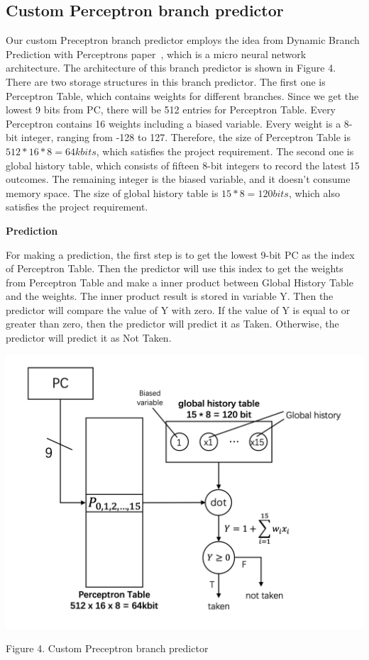 \documentclass[conference]{IEEEtran}
\begin{document}
\subsection{Custom Perceptron branch predictor}
Our custom Preceptron branch predictor employs the idea from Dynamic Branch Prediction with Perceptrons paper~\cite{nicepaper4}, which is a micro neural network architecture. The architecture of this branch predictor is shown in Figure 4.
There are two storage structures in this branch predictor. The first one is Perceptron Table, which contains weights for different branches. Since we get the lowest 9 bits from PC, there will be 512 entries for Perceptron Table. 
Every Perceptron contains 16 weights including a biased variable. Every weight is a 8-bit integer, ranging from -128 to 127. Therefore, the size of Perceptron Table is $512*16*8 = 64k  bits$, which satisfies the project requirement. 
The second one is global history table, which consists of fifteen 8-bit integers to record the latest 15 outcomes. The remaining integer is the biased variable, and it doesn't consume memory space. 
The size of global history table is $15*8 = 120  bits$, which also satisfies the project requirement.

\begin{center}
  \textbf{Prediction}
\end{center}
For making a prediction, the first step is to get the lowest 9-bit PC as the index of Perceptron Table. Then the predictor will use this index to get the weights from Perceptron Table and make a inner product between Global History Table and the weights.
The inner product result is stored in variable Y. Then the predictor will compare the value of Y with zero. If the value of Y is equal to or greater than zero, then the predictor will predict it as Taken. Otherwise, the predictor will predict it as 
Not Taken.

\includegraphics[width=\linewidth]{perceptron.png}
\begin{center}
  {\small Figure 4. Custom Preceptron branch predictor}
\end{center}
\end{document}
